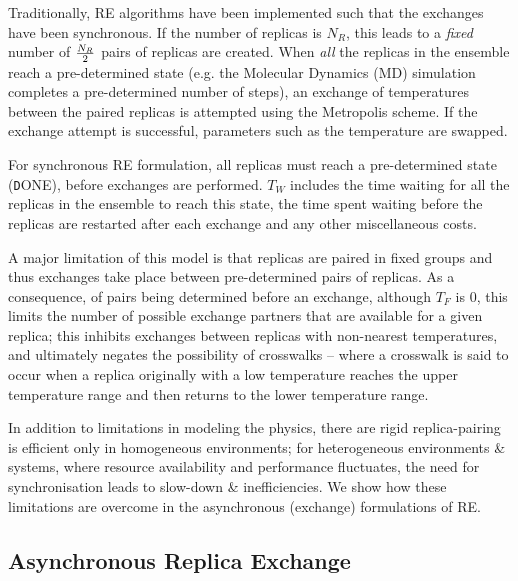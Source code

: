 \documentclass{rspublic}
\begin{document}
Traditionally, RE algorithms have been implemented such that the
exchanges have been synchronous.  If the number of replicas is
${N_R}$, this leads to a {\it fixed} number of ${N_R \over 2}$ pairs
of replicas are created.  When \emph{all} the replicas in the ensemble
reach a pre-determined state (e.g. the Molecular Dynamics (MD)
simulation completes a pre-determined number of steps), an exchange of
temperatures between the paired replicas is attempted using the
Metropolis scheme.  If the exchange attempt is successful, parameters
such as the temperature are swapped.


For synchronous RE formulation, all replicas must reach a
pre-determined state ({\texttt DONE}), before exchanges are performed.
$T_W$ includes the time waiting for all the replicas in the ensemble
to reach this state, the time spent waiting before the replicas are
restarted after each exchange and any other miscellaneous costs.

A major limitation of this model is that replicas are paired in fixed
groups and thus exchanges take place between pre-determined pairs of
replicas.  As a consequence, of pairs being determined before an
exchange, although $T_F$ is $0$, this limits the number of possible
exchange partners that are available for a given replica; this
inhibits exchanges between replicas with non-nearest temperatures, and
ultimately negates the possibility of crosswalks -- where a crosswalk
is said to occur when a replica originally with a low temperature
reaches the upper temperature range and then returns to the lower
temperature range.

In addition to limitations in modeling the physics, there are rigid
replica-pairing is efficient only in homogeneous environments; for
heterogeneous environments \& systems, where resource availability and
performance fluctuates, the need for synchronisation leads to
slow-down \& inefficiencies. We show how these limitations are
overcome in the asynchronous (exchange) formulations of RE.

\subsection{Asynchronous Replica Exchange}

\end{document}
